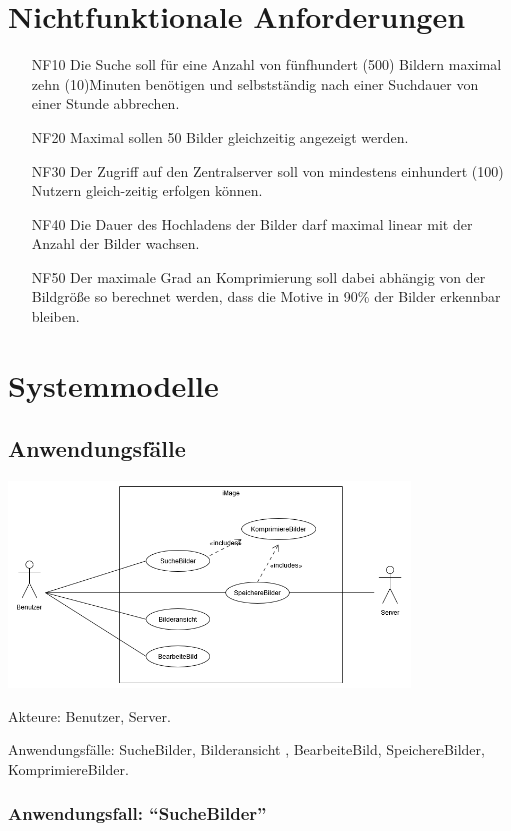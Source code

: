 \documentclass[parskip=full]{scrartcl}
\begin{document}
\section{Nichtfunktionale Anforderungen}
\begin{itemize}[nosep]
\item[NF10] Die Suche soll für eine Anzahl von fünfhundert (500) Bildern maximal zehn (10)Minuten benötigen und selbstständig nach einer Suchdauer von einer Stunde abbrechen.
\item[NF20] Maximal sollen 50  Bilder  gleichzeitig  angezeigt  werden.
\item[NF30] Der Zugriff auf den Zentralserver soll von mindestens einhundert (100) Nutzern gleich-zeitig erfolgen können.
\item[NF40] Die Dauer des Hochladens der Bilder darf maximal linear mit der Anzahl der Bilder wachsen.
\item[NF50] Der maximale Grad an \gls{Komprimierung} soll dabei abhängig von der Bildgröße so berechnet werden, dass die Motive in 90\% der Bilder erkennbar bleiben.
\end{itemize}

\section{Systemmodelle}

\subsection{Anwendungsfälle}
\begin{center}
\includegraphics[width=0.8\textwidth]{iMage_Anwendungsfalldiagramm.png}
\end{center}

Akteure: Benutzer, Server.

Anwendungsfälle: SucheBilder, Bilderansicht , BearbeiteBild, SpeichereBilder, KomprimiereBilder.

\subsubsection{Anwendungsfall: "`SucheBilder"'}
\end{document}
